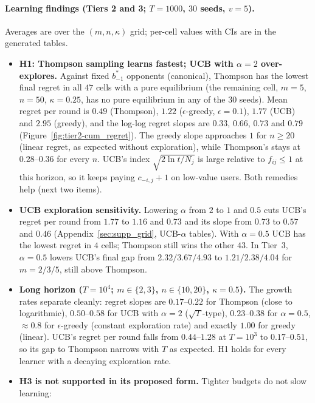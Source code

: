 \documentclass[11pt]{article}
\theoremstyle{remark}
\begin{document}
\paragraph{Learning findings (Tiers 2 and 3; $T=1000$, $30$ seeds, $v=5$).} Averages are over the
$(m,n,\kappa)$ grid; per-cell values with CIs are in the generated tables.
\begin{itemize}[leftmargin=*]
  \item \textbf{H1: Thompson sampling learns fastest; UCB with $\alpha=2$ over-explores.} Against fixed
  $b^*_{-1}$ opponents (canonical), Thompson has the lowest final regret in all $47$ cells with a pure
  equilibrium (the remaining cell, $m=5$, $n=50$, $\kappa=0.25$, has no pure equilibrium in any of the $30$ seeds). Mean regret per round is $0.49$ (Thompson), $1.22$
  ($\epsilon$-greedy, $\epsilon=0.1$), $1.77$ (UCB) and $2.95$ (greedy), and the log-log regret slopes are
  $0.33$, $0.66$, $0.73$ and $0.79$ (Figure~\ref{fig:tier2-cum_regret}). The greedy slope approaches $1$
  for $n\ge20$ (linear regret, as expected without exploration), while Thompson's stays at $0.28$--$0.36$
  for every $n$. UCB's index $\sqrt{2\ln t/N_j}$ is large relative to $f_{ij}\le1$ at this horizon,
  so it keeps paying $c_{-i,j}+1$ on low-value users. Both remedies help (next two items).
  \item \textbf{UCB exploration sensitivity.} Lowering $\alpha$ from $2$ to $1$ and $0.5$ cuts UCB's
  regret per round from $1.77$ to $1.16$ and $0.73$ and its slope from $0.73$ to $0.57$ and $0.46$
  (Appendix~\ref{sec:supp_grid}, UCB-$\alpha$ tables). With $\alpha=0.5$ UCB has the lowest regret in $4$ cells;
  Thompson still wins the other $43$. In Tier~3, $\alpha=0.5$ lowers UCB's final gap from $2.32/3.67/4.93$ to
  $1.21/2.38/4.04$ for $m=2/3/5$, still above Thompson.
  \item \textbf{Long horizon ($T=10^4$; $m\in\{2,3\}$, $n\in\{10,20\}$, $\kappa=0.5$).} The growth rates
  separate cleanly: regret slopes are $0.17$--$0.22$ for Thompson (close to logarithmic), $0.50$--$0.58$
  for UCB with $\alpha=2$ ($\sqrt{T}$-type), $0.23$--$0.38$ for $\alpha=0.5$, $\approx0.8$ for
  $\epsilon$-greedy (constant exploration rate) and exactly $1.00$ for greedy (linear). UCB's regret per
  round falls from $0.44$--$1.28$ at $T=10^3$ to $0.17$--$0.51$, so its gap to Thompson narrows with $T$
  as expected. H1 holds for every learner with a decaying exploration rate.
  \item \textbf{H3 is not supported in its proposed form.} Tighter budgets do not slow learning:

\end{itemize}
\end{document}

